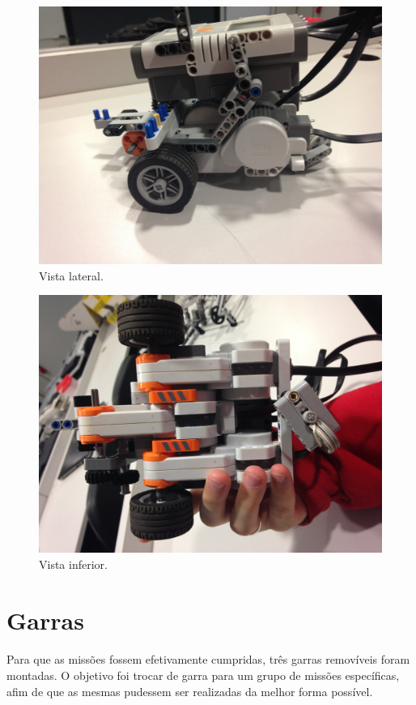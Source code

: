 \documentclass[12pt,a4paper]{article}
\begin{document}
	\begin{figure}[H]
		\includegraphics[width=\linewidth]{../Images/robot_3.JPG}
		\caption{Vista lateral.}
		\label{fig:robot_3}
	\end{figure}

	\begin{figure}[H]
		\includegraphics[width=\linewidth]{../Images/robot_4.JPG}
		\caption{Vista inferior.}
		\label{fig:robot_4}
	\end{figure}

\newpage
\section{Garras}
	\paragraph{}
		Para que as missões fossem efetivamente cumpridas, três garras 
		removíveis foram montadas. O objetivo foi trocar de garra para um grupo 
		de missões específicas, afim de que as mesmas pudessem ser realizadas da 
		melhor forma possível.
\end{document}
